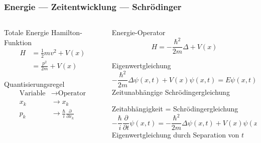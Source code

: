 %
%
%
\bgroup
\begin{frame}[t]
\setlength{\abovedisplayskip}{5pt}
\setlength{\belowdisplayskip}{5pt}
\frametitle{Energie --- Zeitentwicklung --- Schrödinger}
\vspace{-20pt}
\begin{columns}[t,onlytextwidth]
\begin{column}{0.30\textwidth}
\begin{block}{Totale Energie}
Hamilton-Funktion
\begin{align*}
H
&=
\frac12mv^2 + V(x)
\\
&=
\frac{p^2}{2m} + V(x)
\end{align*}
\end{block}
\begin{block}{Quantisierungsregel}
\begin{align*}
\text{Variable}&\to \text{Operator}
\\
x_k & \to x_k
\\
p_k & \to \frac{\hbar}{i} \frac{\partial}{\partial x_k}
\end{align*}
\end{block}
\end{column}
\begin{column}{0.66\textwidth}
\begin{block}{Energie-Operator}
\[
H
=
-\frac{\hbar^2}{2m}\Delta + V(x)
\]
\end{block}
\begin{block}{Eigenwertgleichung}
\[
-\frac{\hbar^2}{2m}\Delta\psi(x,t) + V(x)\psi(x,t) = E\psi(x,t)
\]
Zeitunabhängige Schrödingergleichung
\end{block}
\begin{block}{Zeitabhängigkeit = Schrödingergleichung}
\[
-\frac{\hbar}{i}
\frac{\partial}{\partial t}
\psi(x,t)
=
-\frac{\hbar^2}{2m}\Delta\psi(x,t) + V(x)\psi(x,t)
\]
Eigenwertgleichung durch Separation von $t$
\end{block}
\end{column}
\end{columns}
\end{frame}
\egroup
